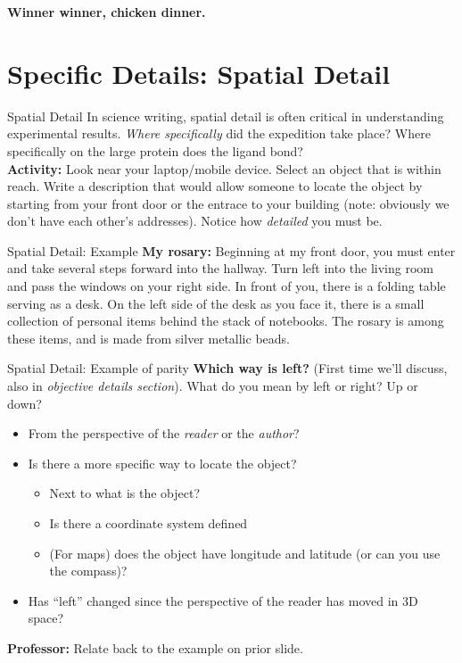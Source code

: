 \documentclass{beamer}
\begin{document}
\begin{frame}
\textbf{Winner winner, chicken dinner.}
\end{frame}

\section{Specific Details: Spatial Detail}

\begin{frame}{Spatial Detail}
In science writing, spatial detail is often critical in understanding experimental results.  \textit{Where specifically} did the expedition take place?  Where specifically on the large protein does the ligand bond? \\ \vspace{0.25cm}
\textbf{Activity:} Look near your laptop/mobile device.  Select an object that is within reach.  Write a description that would allow someone to locate the object by starting from your front door or the entrace to your building (note: obviously we don't have each other's addresses).  Notice how \textit{detailed} you must be.
\end{frame}

\begin{frame}{Spatial Detail: Example}
\textbf{My rosary:} Beginning at my front door, you must enter and take several steps forward into the hallway.  Turn left into the living room and pass the windows on your right side.  In front of you, there is a folding table serving as a desk.  On the left side of the desk as you face it, there is a small collection of personal items behind the stack of notebooks.  The rosary is among these items, and is made from silver metallic beads.
\end{frame}

\begin{frame}{Spatial Detail: Example of parity}
\textbf{Which way is left?} (First time we'll discuss, also in \textit{objective details section}).  What do you mean by left or right?  Up or down? \\
\begin{itemize}
\item From the perspective of the \textit{reader} or the \textit{author}?
\item Is there a more specific way to locate the object?
\begin{itemize}
\item Next to what is the object?
\item Is there a coordinate system defined
\item (For maps) does the object have longitude and latitude (or can you use the compass)?
\end{itemize}
\item Has ``left'' changed since the perspective of the reader has moved in 3D space?
\end{itemize}
\textbf{Professor:} Relate back to the example on prior slide.
\end{frame}
\end{document}
